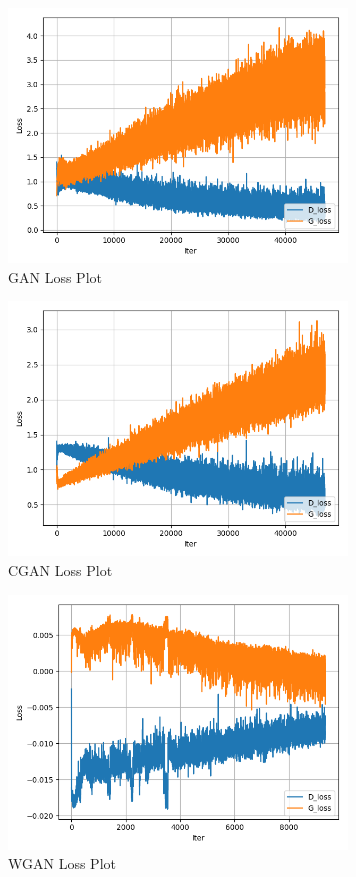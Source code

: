 \documentclass[conference]{IEEEtran}
\begin{document}
    \begin{figure}
        \caption{GAN Loss Plot}
        \label{fig:loss-plot-gan}
        \includegraphics[width=9cm]{GAN_loss.png}
        \centering
    \end{figure}

    \begin{figure}
        \caption{CGAN Loss Plot}
        \label{fig:loss-plot-cgan}
        \includegraphics[width=9cm]{CGAN_loss.png}
        \centering
    \end{figure}

    \begin{figure}
        \caption{WGAN Loss Plot}
        \label{fig:loss-plot-wgan}
        \includegraphics[width=9cm]{WGAN_loss.png}
        \centering
    \end{figure}
\end{document}

